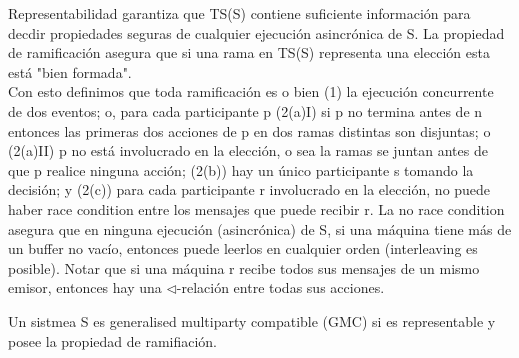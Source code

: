 Representabilidad garantiza que TS(S) contiene suficiente información para decdir propiedades seguras de cualquier ejecución asincrónica de S. La propiedad de ramificación asegura que si una rama en TS(S) representa una elección esta está "bien formada".\\
 
Con esto definimos que toda ramificación es o bien (1) la ejecución concurrente de dos eventos; o, para cada participante p (2(a)I) si p no termina antes de n entonces las primeras dos acciones de p en dos ramas distintas son disjuntas; o (2(a)II) p no está involucrado en la elección, o sea la ramas se juntan antes de que p realice ninguna acción; (2(b)) hay un único participante s tomando la decisión; y (2(c)) para cada participante r involucrado en la elección, no puede haber race condition entre los mensajes que puede recibir r. La no race condition asegura que en ninguna ejecución (asincrónica) de S, si una máquina tiene más de un buffer no vacío, entonces puede leerlos en cualquier orden (interleaving es posible). Notar que si una máquina r recibe todos sus mensajes de un mismo emisor, entonces hay una $\triangleleft$-relación entre todas sus acciones.

\begin{definition} Un sistmea S es generalised multiparty compatible (GMC) si es representable y posee la propiedad de ramifiación. 
\end{definition}

